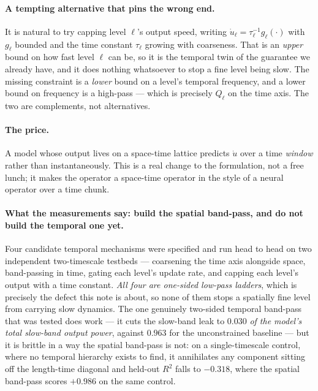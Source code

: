 \documentclass[11pt,a4paper]{article}
\begin{document}
\paragraph{A tempting alternative that pins the wrong end.} It is natural to try capping
level $\ell$'s output speed, writing $\dot u_\ell = \tau_\ell^{-1} g_\ell(\cdot)$ with
$g_\ell$ bounded and the time constant $\tau_\ell$ growing with coarseness. That is an
\emph{upper} bound on how fast level $\ell$ can be, so it is the temporal twin of the
guarantee we already have, and it does nothing whatsoever to stop a fine level being slow.
The missing constraint is a \emph{lower} bound on a level's temporal frequency, and a lower
bound on frequency is a high-pass --- which is precisely $Q_\ell$ on the time
axis. The two are complements, not alternatives.

\paragraph{The price.} A model whose output lives on a space-time lattice predicts $\dot u$
over a time \emph{window} rather than instantaneously. This is a real change to the
formulation, not a free lunch; it makes the operator a space-time operator in the style of
a neural operator over a time chunk.

\paragraph{What the measurements say: build the spatial band-pass, and do not build the
temporal one yet.} Four candidate temporal mechanisms were specified and run head to head on
two independent two-timescale testbeds --- coarsening the time axis alongside space,
band-passing in time, gating each level's update rate, and capping each level's output with a
time constant. \emph{All four are one-sided low-pass ladders}, which is precisely the defect
this note is about, so none of them stops a spatially fine level from carrying slow dynamics.
The one genuinely two-sided temporal band-pass that was tested does work --- it cuts the
slow-band leak to $0.030$ \emph{of the model's total slow-band output power}, against
$0.963$ for the unconstrained baseline --- but it is brittle in a way the spatial band-pass
is not: on a single-timescale control, where no temporal hierarchy exists to find, it
annihilates any component sitting off the length-time diagonal and held-out $R^2$ falls to
$-0.318$, where the spatial band-pass scores $+0.986$ on the same control.
\end{document}
